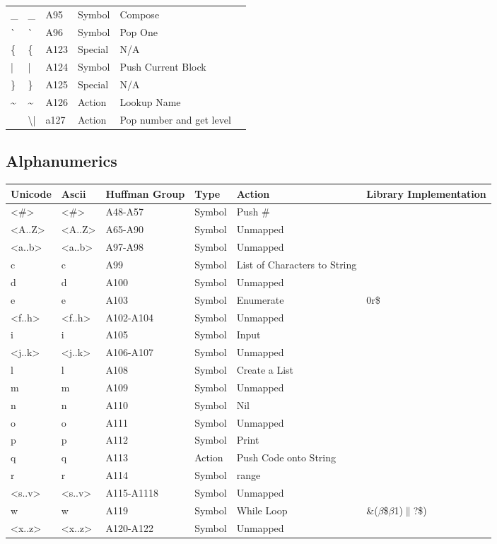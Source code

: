 \documentclass{article}
\newcommand\escape\textbackslash
\begin{document}
\begin{tabular}{| >{\ttfamily}l| >{\ttfamily}l| >{\ttfamily}l|l|l| >{\ttfamily}l|}
    \_ & \_ & A95 & Symbol & Compose & \\
    \`{} & \`{} & A96 & Symbol & Pop One & \\
    \{ & \{ & A123 & Special & N/A & \\
    | & | & A124 & Symbol & Push Current Block &\\
    \} & \} & A125 & Special & N/A & \\
    \textasciitilde & \textasciitilde & A126 & Action & Lookup Name\\
    \textbrokenbar{} & \escape{|} & a127 & Action & Pop number and get level &\\
    \hline
\end{tabular}

\subsection{Alphanumerics}

\begin{tabular}{| >{\ttfamily}l| >{\ttfamily}l| >{\ttfamily}l|l|l| >{\ttfamily}l|}
    \hline
    \textbf{Unicode} & \textbf{Ascii} & \textbf{Huffman Group}& \textbf{Type} & \textbf{Action} & \textbf{Library Implementation}\\
    \hline
    <\#> & <\#> & A48-A57 & Symbol & Push \# & \\
    <A..Z> & <A..Z> & A65-A90 & Symbol & Unmapped & \\
    <a..b> & <a..b> & A97-A98 & Symbol & Unmapped & \\
    c & c & A99 & Symbol & List of Characters to String & \\
    d & d & A100 & Symbol & Unmapped & \\
    e & e & A103 & Symbol & Enumerate & 0r\$\\
    <f..h> & <f..h> & A102-A104 & Symbol & Unmapped & \\
    i & i & A105 & Symbol & Input & \\
    <j..k> & <j..k> & A106-A107 & Symbol & Unmapped & \\
    l & l & A108 & Symbol & Create a List & \\
    m & m & A109 & Symbol & Unmapped & \\
    n & n & A110 & Symbol & Nil & \\
    o & o & A111 & Symbol & Unmapped & \\
    p & p & A112 & Symbol & Print & \\
    q & q & A113 & Action & Push Code onto String & \\
    r & r & A114 & Symbol & range & \\
    <s..v> & <s..v> & A115-A1118 & Symbol & Unmapped & \\
    w & w & A119 & Symbol & While Loop & 1\&($\beta$\$$\beta$1\textbrokenbar{})$\parallel$?\$)\\
    <x..z> & <x..z> & A120-A122 & Symbol & Unmapped & \\
    \hline
\end{tabular}
\end{document}

